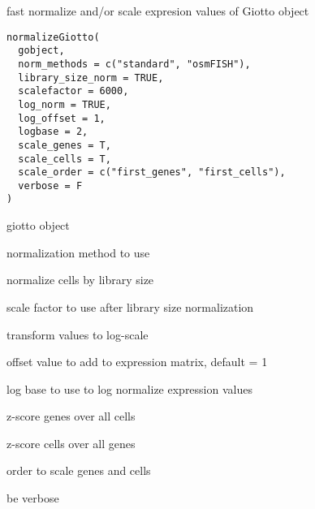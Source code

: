 \documentclass[a4paper]{book}
\begin{document}
%
\begin{Description}\relax
fast normalize and/or scale expresion values of Giotto object
\end{Description}
%
\begin{Usage}
\begin{verbatim}
normalizeGiotto(
  gobject,
  norm_methods = c("standard", "osmFISH"),
  library_size_norm = TRUE,
  scalefactor = 6000,
  log_norm = TRUE,
  log_offset = 1,
  logbase = 2,
  scale_genes = T,
  scale_cells = T,
  scale_order = c("first_genes", "first_cells"),
  verbose = F
)
\end{verbatim}
\end{Usage}
%
\begin{Arguments}
\begin{ldescription}
\item[\code{gobject}] giotto object

\item[\code{norm\_methods}] normalization method to use

\item[\code{library\_size\_norm}] normalize cells by library size

\item[\code{scalefactor}] scale factor to use after library size normalization

\item[\code{log\_norm}] transform values to log-scale

\item[\code{log\_offset}] offset value to add to expression matrix, default = 1

\item[\code{logbase}] log base to use to log normalize expression values

\item[\code{scale\_genes}] z-score genes over all cells

\item[\code{scale\_cells}] z-score cells over all genes

\item[\code{scale\_order}] order to scale genes and cells

\item[\code{verbose}] be verbose
\end{ldescription}
\end{Arguments}
%
\end{document}
